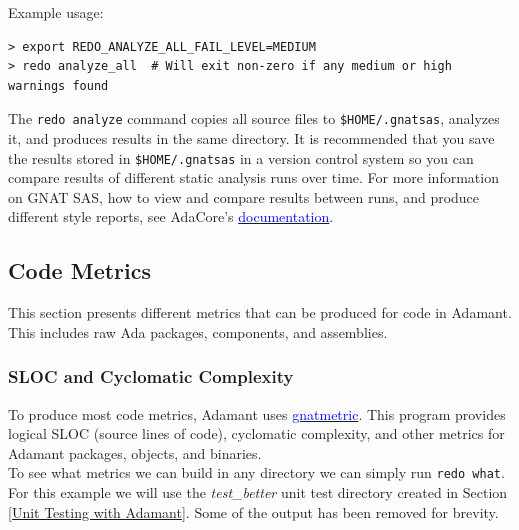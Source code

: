 Example usage:

\vspace{5mm} %
\begin{verbatim}
> export REDO_ANALYZE_ALL_FAIL_LEVEL=MEDIUM
> redo analyze_all  # Will exit non-zero if any medium or high warnings found
\end{verbatim}
\vspace{5mm} %

The \texttt{redo analyze} command copies all source files to \texttt{\$HOME/.gnatsas}, analyzes it, and produces results in the same directory. It is recommended that you save the results stored in \texttt{\$HOME/.gnatsas} in a version control system so you can compare results of different static analysis runs over time. For more information on GNAT SAS, how to view and compare results between runs, and produce different style reports, see AdaCore's \href{https://docs.adacore.com/live/wave/gnatsas/html/user_guide/getting_started.html}{\textcolor{blue}{documentation}}.

\subsection{Code Metrics} \label{Code Metrics}

This section presents different metrics that can be produced for code in Adamant. This includes raw Ada packages, components, and assemblies.

\subsubsection{SLOC and Cyclomatic Complexity}

To produce most code metrics, Adamant uses \href{https://gcc.gnu.org/onlinedocs/gcc-4.8.4/gnat_ugn/The-GNAT-Metric-Tool-gnatmetric.html}{\textcolor{blue}{gnatmetric}}. This program provides logical SLOC (source lines of code), cyclomatic complexity, and other metrics for Adamant packages, objects, and binaries. \\

To see what metrics we can build in any directory we can simply run \texttt{redo what}. For this example we will use the \textit{test\_better} unit test directory created in Section \ref{Unit Testing with Adamant}. Some of the output has been removed for brevity.

